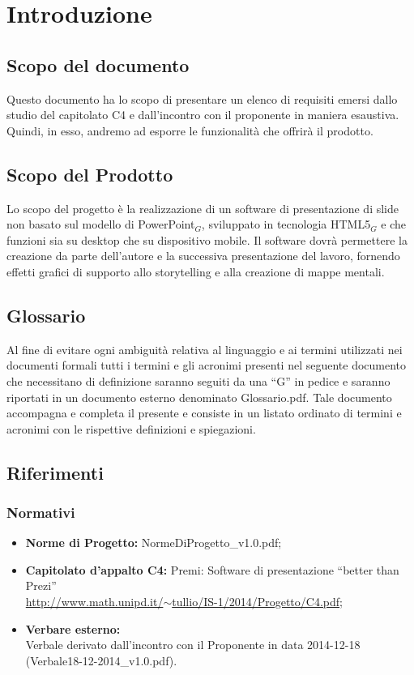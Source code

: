 \section{Introduzione}

\subsection{Scopo del documento}
Questo documento ha lo scopo di presentare un elenco di requisiti emersi dallo studio del capitolato C4 e dall'incontro con il proponente in maniera esaustiva. Quindi, in esso, andremo ad esporre le funzionalità che offrirà il prodotto.

\subsection{Scopo del Prodotto}
Lo scopo del progetto è la realizzazione di un software di presentazione di slide non basato sul modello di PowerPoint$_{G}$, sviluppato in tecnologia HTML5$_{G}$ e che funzioni sia su desktop che su dispositivo mobile. Il software dovrà permettere la creazione da parte dell'autore e la successiva presentazione del lavoro, fornendo effetti grafici di supporto allo storytelling e alla creazione di mappe mentali. 

\subsection{Glossario}
Al fine di evitare ogni ambiguità relativa al linguaggio e ai termini utilizzati nei documenti formali tutti i termini e gli acronimi presenti nel seguente documento che necessitano di definizione saranno seguiti da una ``G'' in pedice e saranno riportati in un documento esterno denominato Glossario.pdf. Tale documento accompagna e completa il presente e consiste in un listato ordinato di termini e acronimi con le rispettive definizioni e spiegazioni.

\subsection{Riferimenti}
\subsubsection{Normativi}
\begin{itemize}
	\item \textbf{Norme di Progetto:} NormeDiProgetto\_v1.0.pdf;
	\item \textbf{Capitolato d’appalto C4:} Premi: Software di presentazione ``better than Prezi''\\ \href{http://www.math.unipd.it/~tullio/IS-1/2014/Progetto/C4.pdf}{http://www.math.unipd.it/$\sim$tullio/IS-1/2014/Progetto/C4.pdf};
	\item \textbf{Verbare esterno:} \\ 
		Verbale derivato dall'incontro con il Proponente in data 2014-12-18 (Verbale18-12-2014\_v1.0.pdf).
\end{itemize}

